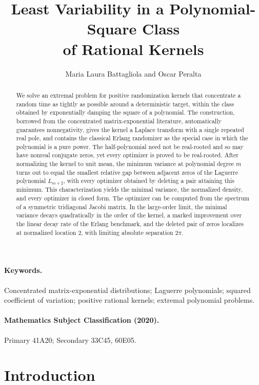 \documentclass[11pt]{article}
\title{Least Variability in a Polynomial-Square Class\\ of Rational Kernels}
\author{Maria Laura Battagliola and Oscar Peralta}
\date{}
\numberwithin{equation}{section}
\theoremstyle{definition}
\theoremstyle{remark}
\begin{document}
\maketitle

\begin{abstract}
We solve an extremal problem for positive randomization kernels that
concentrate a random time as tightly as possible around a deterministic
target, within the class obtained by exponentially damping the square
of a polynomial. The construction, borrowed from the concentrated
matrix-exponential literature, automatically guarantees nonnegativity, gives
the kernel a Laplace transform with a single repeated real pole, and
contains the classical Erlang randomizer as the special case in which the
polynomial is a pure power. The half-polynomial need not be
real-rooted and so may have nonreal conjugate zeros, yet every optimizer is
proved to be real-rooted. After normalizing the kernel to unit mean,
the minimum variance at polynomial degree $m$ turns out to equal the
smallest relative gap between adjacent zeros of the Laguerre polynomial
$L_{m+2}$, with every optimizer obtained by deleting a pair attaining this
minimum. This characterization yields the
minimal variance, the normalized density, and every optimizer in closed form.
The optimizer can be computed from the spectrum of a symmetric tridiagonal
Jacobi matrix. In the large-order limit, the minimal variance decays
quadratically in the order of the kernel, a marked improvement over the
linear decay rate of the Erlang benchmark, and the deleted pair of zeros
localizes at normalized location $2$, with limiting absolute separation
$2\pi$.
\end{abstract}


\paragraph{Keywords.}
Concentrated matrix-exponential distributions; Laguerre polynomials; squared coefficient of variation; positive rational kernels; extremal polynomial problems.



\paragraph{Mathematics Subject Classification (2020).}
Primary 41A20; Secondary 33C45, 60E05.


\section{Introduction}\label{sec:introduction}
\end{document}
